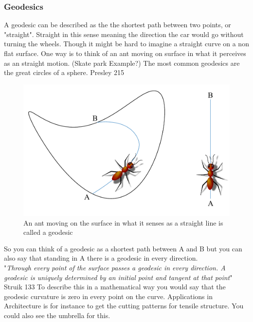 \subsubsection{Geodesics}

A geodesic can be described as the the shortest path between two points, or "straight". Straight in this sense meaning the direction the car would go without turning the wheels. Though it might be hard to imagine a straight curve on a non flat surface. One way is to think of an ant moving on surface in what it perceives as an straight motion. (Skate park Example?) The most common geodesics are the great circles of a sphere. Presley 215

\begin{figure}[H]
\centering
\includegraphics[width=0.7\linewidth ]{figure/Theory/Geodesics.pdf}
\caption{An ant moving on the surface in what it senses as a straight line is called a geodesic }
\end{figure}

So you can think of a geodesic as a shortest path between A and B but you can also say that standing in A there is a geodesic in every direction.\\
"\textit{Through every point of the surface passes a geodesic in every direction. A geodesic is uniquely determined by an initial point and tangent at that point}" Struik 133
To describe this in a mathematical way you would say that the geodesic curvature is zero in every point on the curve. 
Applications in Architecture is for instance to get the cutting patterns for tensile structure. You could also see the umbrella for this.


